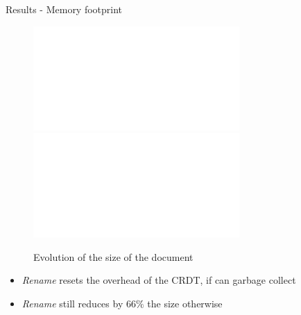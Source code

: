 \documentclass[10pt]{beamer}
\begin{document}
\begin{frame}{Results - Memory footprint}
  \begin{figure}
    \centering
    \includegraphics<2>[width=0.7\textwidth]{img/snapshots-sizes-2.pdf}
    \includegraphics<3>[width=0.7\textwidth]{img/snapshots-sizes.pdf}
    \caption{Evolution of the size of the document}
    \label{fig:evolution-document-size}
  \end{figure}

  \vspace{-1\baselineskip}
  \begin{itemize}
    \item<2-> \emph{Rename} resets the overhead of the CRDT, if can garbage collect
    \item<3> \emph{Rename} still reduces by $66\%$ the size otherwise
  \end{itemize}
\end{frame}
\end{document}
